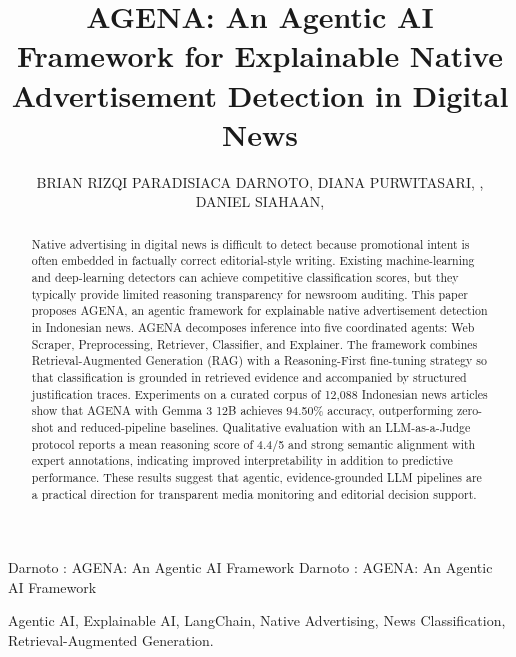 \documentclass{ieeeaccess}
\begin{document}

\title{AGENA: An Agentic AI Framework for Explainable Native Advertisement Detection in Digital News}
\author{\uppercase{Brian Rizqi Paradisiaca Darnoto, Diana Purwitasari, , Daniel Siahaan,
}}
\address[]{Informatics Department, Institut Teknologi Sepuluh Nopember, Surabaya, 60111, Indonesia}
\address[]{Informatics, Universitas Jember, Jember, 68121, Indonesia}

\markboth
{Darnoto \headeretal: AGENA: An Agentic AI Framework}
{Darnoto \headeretal: AGENA: An Agentic AI Framework}


\begin{abstract}
Native advertising in digital news is difficult to detect because promotional intent is often embedded in factually correct editorial-style writing. Existing machine-learning and deep-learning detectors can achieve competitive classification scores, but they typically provide limited reasoning transparency for newsroom auditing. This paper proposes AGENA, an agentic framework for explainable native advertisement detection in Indonesian news. AGENA decomposes inference into five coordinated agents: Web Scraper, Preprocessing, Retriever, Classifier, and Explainer. The framework combines Retrieval-Augmented Generation (RAG) with a Reasoning-First fine-tuning strategy so that classification is grounded in retrieved evidence and accompanied by structured justification traces. Experiments on a curated corpus of 12,088 Indonesian news articles show that AGENA with Gemma 3 12B achieves 94.50\% accuracy, outperforming zero-shot and reduced-pipeline baselines. Qualitative evaluation with an LLM-as-a-Judge protocol reports a mean reasoning score of 4.4/5 and strong semantic alignment with expert annotations, indicating improved interpretability in addition to predictive performance. These results suggest that agentic, evidence-grounded LLM pipelines are a practical direction for transparent media monitoring and editorial decision support.
\end{abstract}

\begin{keywords}
Agentic AI, Explainable AI, LangChain, Native Advertising, News Classification, Retrieval-Augmented Generation.
\end{keywords}
\end{document}
